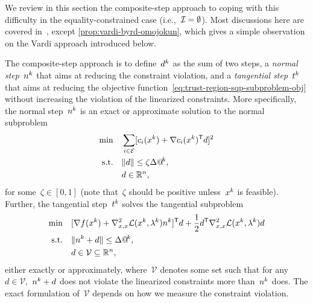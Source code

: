 We review in this section the composite-step approach to coping with this difficulty in the equality-constrained case (i.e.,~$\mathcal{I} = \emptyset$).
Most discussions here are covered in~\cite[\S~15.4]{Conn_Gould_Toint_2000}, except \cref{prop:vardi-byrd-omojokun}, which gives a simple observation on the Vardi approach introduced below.

The composite-step approach is to define~$\step[k]$ as the sum of two steps, a \emph{normal step}~$\nstep[k]$ that aims at reducing the constraint violation, and a \emph{tangential step}~$\tstep[k]$ that aims at reducing the objective function~\cref{eq:trust-region-sqp-subproblem-obj} without increasing the violation of the linearized constraints.
More specifically, the normal step~$\nstep[k]$ is an exact or approximate solution to the normal subproblem
\begin{subequations}
    \label{eq:byrd-omojokun-original}
    \begin{align}
        \min        & \quad \sum_{i \in \ieq} [\con{i}(\iter[k]) + \nabla \con{i}(\iter[k])^{\T} \step]^2 \label{eq:byrd-omojokun-original-obj}\\
        \text{s.t.} & \quad \norm{\step} \le \zeta \rad[k],\\
                    & \quad \step \in \R^n, \nonumber
    \end{align}
\end{subequations}
for some~$\zeta \in [0, 1]$ (note that~$\zeta$ should be positive unless~$\iter[k]$ is feasible).
Further, the tangential step~$\tstep[k]$ solves the tangential subproblem
\begin{subequations}
    \label{eq:tangential-step-original}
    \begin{align}
        \min        & \quad [\nabla \obj(\iter[k]) + \nabla_{x, x}^2 \lag(\iter[k], \lm[k]) \nstep[k]]^{\T} \step + \frac{1}{2} \step^{\T} \nabla_{x, x}^2 \lag(\iter[k], \lm[k]) \step\\
        \text{s.t.} & \quad \norm{\nstep[k] + \step} \le \rad[k],\\
                    & \quad \step \in \mathcal{V} \subseteq \R^n,
    \end{align}
\end{subequations}
either exactly or approximately, where~$\mathcal{V}$ denotes some set such that for any~$d \in \mathcal{V}$,~$\nstep[k] + \step$ does not violate the linearized constraints more than~$\nstep[k]$ does.
The exact formulation of~$\mathcal{V}$ depends on how we measure the constraint violation.

